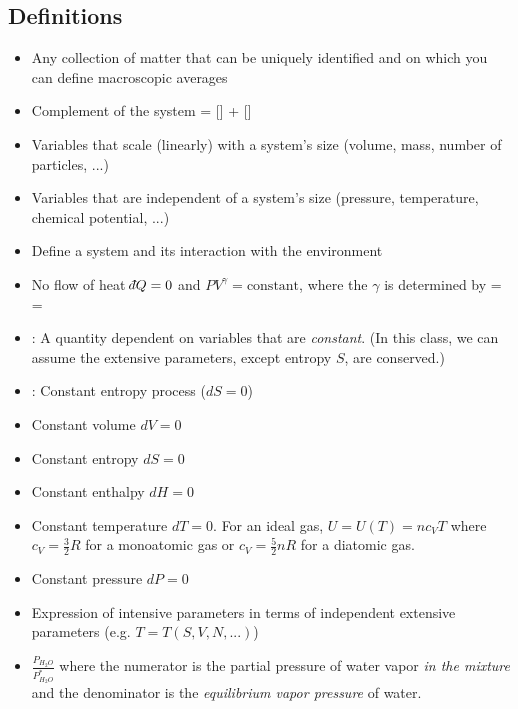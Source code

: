 \documentclass[12pt]{article}
\def\dbar{{\mathchar'26\mkern-12mu d}}
\begin{document}
\subsection{Definitions}
\begin{itemize}
\item {} Any collection of matter that can be uniquely identified and on which you can define macroscopic averages
\item {}  Complement of the system
\eqs
\text{[Universe]} = [] + []
\eqe

\item {} Variables that scale (linearly) with a system's size (volume, mass, number of particles, ...)
\item {} Variables that are  independent of a system's size (pressure, temperature, chemical potential, ...)
\item {} Define a system and its interaction with the environment
\item {} No flow of heat $\dbar Q = 0$ and $PV^{\gamma} = \text{constant}$, where the $\gamma$ is determined by
\eqs
\gamma =  = 
\eqe
\item {}: A quantity dependent on variables that are \emph{constant}.  (In this class, we can assume the extensive parameters, except entropy $S$, are conserved.)
\item {}: Constant entropy process ($dS=0$)
\item {} Constant volume $dV = 0$
\item {} Constant entropy $dS = 0$
\item {} Constant enthalpy $dH = 0$
\item {} Constant temperature $dT=0$.  For an ideal gas, $U = U(T) = n c_V T$ where $c_V = \frac{3}{2} R$ for a monoatomic gas or $c_V = \frac{5}{2} n R$ for a diatomic gas.
\item {} Constant pressure $dP = 0$
\item {} Expression of intensive parameters in terms of independent extensive parameters (e.g. $T= T(S,V,N,...)$)
\item {} $\frac{P_{H_2O}}{P_{H_2O}^*}$ where the numerator is the partial pressure of water vapor \emph{in the mixture} and the denominator is the \emph{equilibrium vapor pressure} of water.

\end{itemize}
\end{document}
